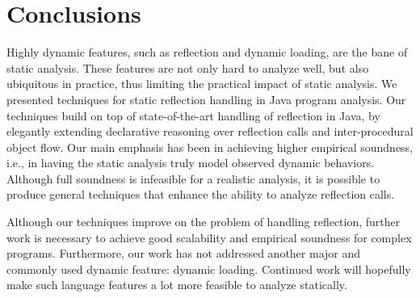 

\section{Conclusions}



Highly dynamic features, such as reflection and dynamic loading, are
the bane of static analysis. These features are not only hard to
analyze well, but also ubiquitous in practice, thus limiting the
practical impact of static analysis. We presented techniques for
static reflection handling in Java program analysis. Our techniques
build on top of state-of-the-art handling of reflection in Java, by
elegantly extending declarative reasoning over reflection calls and
inter-procedural object flow. Our main emphasis has been in achieving
higher empirical soundness, i.e., in having the static analysis truly
model observed dynamic behaviors. Although full soundness is
infeasible for a realistic analysis, it is possible to produce
general techniques that enhance the ability to analyze reflection calls.

Although our techniques improve on the problem of handling reflection,
further work is necessary to achieve 
good scalability and empirical
soundness for complex programs.
Furthermore, our work has not addressed another major and
commonly used dynamic feature: dynamic loading. Continued work will
hopefully make such language features a lot more feasible to analyze
statically.

